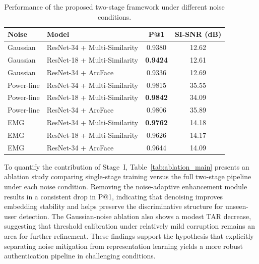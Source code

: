 \documentclass[a4paper,conference]{IEEEtran}
\begin{document}
	\begin{table}[htbp]
		\centering
		\caption{Performance of the proposed two-stage framework under different noise conditions.}
		\label{tab:two_stage_results}
		\begin{tabular}{l l c c}
			\hline
			\textbf{Noise} & \textbf{Model} & \textbf{P@1} & \textbf{SI-SNR (dB)} \\
			\hline
			Gaussian   & ResNet-34 + Multi-Similarity & 0.9380 & 12.62 \\
			Gaussian   & ResNet-18 + Multi-Similarity & \textbf{0.9424} & 12.61 \\
			Gaussian   & ResNet-34 + ArcFace          & 0.9336 & 12.69 \\
			\hline
			Power-line & ResNet-34 + Multi-Similarity & 0.9815 & 35.55 \\
			Power-line & ResNet-18 + Multi-Similarity & \textbf{0.9842} & 34.09 \\
			Power-line & ResNet-34 + ArcFace          & 0.9806 & 35.89 \\
			\hline
			EMG        & ResNet-34 + Multi-Similarity & \textbf{0.9762} & 14.18 \\
			EMG        & ResNet-18 + Multi-Similarity & 0.9626 & 14.17 \\
			EMG        & ResNet-34 + ArcFace          & 0.9644 & 14.09 \\
			\hline
		\end{tabular}
	\end{table}
	
	To quantify the contribution of Stage~I, Table~\ref{tab:ablation_main} presents an ablation study comparing single-stage training versus the full two-stage pipeline under each noise condition. Removing the noise-adaptive enhancement module results in a consistent drop in P@1, indicating that denoising improves embedding stability and helps preserve the discriminative structure for unseen-user detection. The Gaussian-noise ablation also shows a modest TAR decrease, suggesting that threshold calibration under relatively mild corruption remains an area for further refinement. These findings support the hypothesis that explicitly separating noise mitigation from representation learning yields a more robust authentication pipeline in challenging conditions.
	
\end{document}
